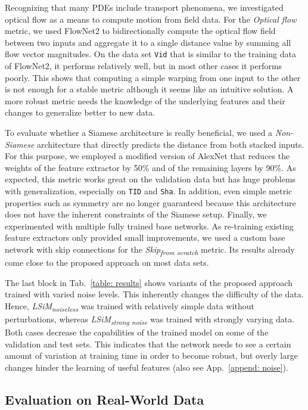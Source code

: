 \documentclass{article}
\begin{document}
Recognizing that many PDEs include transport phenomena, we investigated optical flow \citep{horn1981} as a means to compute motion from field data. For the \textit{Optical flow} metric, we used FlowNet2 \citep{ilg2016} to bidirectionally compute the optical flow field between two inputs and aggregate it to a single distance value by summing all flow vector magnitudes. On the data set \texttt{Vid} that is similar to the training data of FlowNet2, it performs relatively well, but in most other cases it performs poorly. This shows that computing a simple warping from one input to the other is not enough for a stable metric although it seems like an intuitive solution. A more robust metric needs the knowledge of the underlying features and their changes to generalize better to new data. 

To evaluate whether a Siamese architecture is really beneficial, we used a \textit{Non-Siamese} architecture that directly predicts the distance from both stacked inputs. For this purpose, we employed a modified version of AlexNet that reduces the weights of the feature extractor by 50\% and of the remaining layers by 90\%. As expected, this metric works great on the validation data but has huge problems with generalization, especially on \texttt{TID} and \texttt{Sha}. In addition, even simple metric properties such as symmetry are no longer guaranteed because this architecture does not have the inherent constraints of the Siamese setup. 
Finally, we experimented with multiple fully trained base networks. As re-training existing feature extractors only provided small improvements, we used a custom base network with skip connections for the \textit{Skip\textsubscript{from scratch}} metric. Its results already come close to the proposed approach on most data sets.

The last block in Tab.~\ref{table: results} shows variants of the proposed approach trained with varied noise levels. This inherently changes the difficulty of the data. Hence, \textit{LSiM\textsubscript{noiseless}} was trained with relatively simple data without perturbations, whereas \textit{LSiM\textsubscript{strong noise}} was trained with strongly varying data. Both cases decrease the capabilities of the trained model on some of the validation and test sets. This indicates that the network needs to see a certain amount of variation at training time in order to become robust, but overly large changes hinder the learning of useful features (also see App.~\ref{append: noise}). 


\subsection{Evaluation on Real-World Data} \label{subsec: real-world evaluation}
\end{document}
